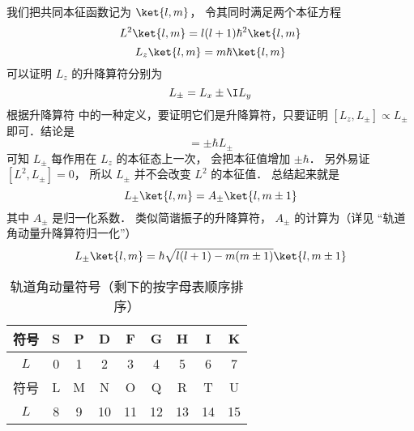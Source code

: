 我们把共同本征函数记为 $\ket{l,m}$， 令其同时满足两个本征方程
\begin{equation}
L^2\ket{l,m} = l(l+1)\hbar^2 \ket{l,m}
\end{equation}
\begin{equation}
L_z\ket{l,m} = m\hbar \ket{l,m}
\end{equation}
可以证明 $L_z$ 的升降算符分别为
\begin{equation}
L_\pm = L_x \pm \I L_y
\end{equation}
根据升降算符 中的一种定义，要证明它们是升降算符，只要证明 $[L_z, L_\pm] \propto L_\pm$ 即可．结论是 %
\begin{equation}
[L_z, L_\pm] =  \pm \hbar L_ \pm
\end{equation}
可知 $L_\pm$ 每作用在 $L_z$ 的本征态上一次， 会把本征值增加 $\pm\hbar$． 另外易证 $[L^2, L_\pm] = 0$， 所以 $L_\pm$ 并不会改变 $L^2$ 的本征值． 总结起来就是
\begin{equation}
L_\pm \ket{l,m} = A_\pm \ket{l,m \pm 1}
\end{equation}
其中 $A_\pm$ 是归一化系数． 类似简谐振子的升降算符， $A_\pm$ 的计算为（详见 “轨道角动量升降算符归一化”）
\begin{equation}
L_\pm \ket{l, m}  = \hbar \sqrt{l(l + 1) - m(m \pm 1)} \ket{l, m \pm 1} 
\end{equation}

\begin{table}[ht]
\centering
\caption{轨道角动量符号（剩下的按字母表顺序排序）}\label{QOrbAM_tab1}
\begin{tabular}{|c|c|c|c|c|c|c|c|c|}
\hline
符号 & S & P & D & F & G & H & I & K\\
\hline
$L$ & 0 & 1 & 2 & 3 & 4 & 5 & 6 & 7\\
\hline
符号 & L & M & N & O & Q & R & T & U \\
\hline
$L$ & 8 & 9 & 10 & 11 & 12 & 13 & 14 & 15 \\
\hline
\end{tabular}
\end{table}
